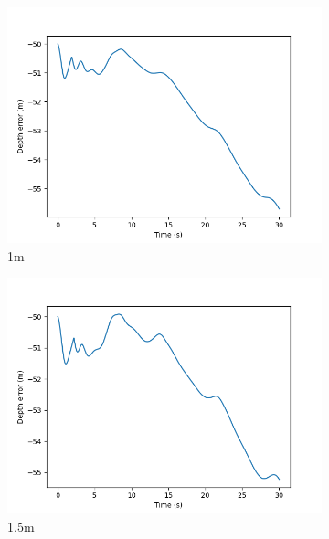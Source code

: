 \documentclass[class=article, crop=false]{standalone}
\begin{document}
\begin{figure}
\begin{subfigure}[b]{0.48\textwidth}
        \includegraphics{scenario1/rov-50m/1.0m/rov_depth_error_controlled}
        \caption{1m}
        \label{}
    \end{subfigure}
    \hfill
    \begin{subfigure}[b]{0.48\textwidth}
        \centering
        \includegraphics{scenario1/rov-50m/1.5m/rov_depth_error_controlled}
        \caption{1.5m}
        \label{}
    \end{subfigure}
    \vfill
    \begin{subfigure}[b]{0.48\textwidth}
        \centering

\end{subfigure}
\end{figure}
\end{document}
